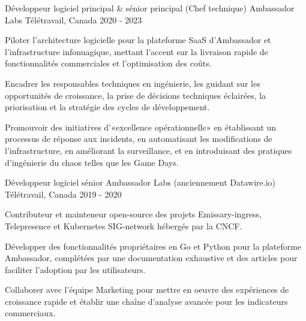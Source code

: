 \begin{cventries}
  \cventry
    {Développeur logiciel principal \& sénior principal (Chef technique)} %
    {Ambassador Labs} %
    {Télétravail, Canada} %
    {2020 - 2023} %
    {
      \begin{cvitems} %
        \item {Piloter l'architecture logicielle pour la plateforme SaaS d'Ambassador et l'infrastructure infonuagique, mettant l'accent sur la livraison rapide de fonctionnalités commerciales et l'optimisation des coûts.}
        \item {Encadrer les responsables techniques en ingénierie, les guidant sur les opportunités de croissance, la prise de décisions techniques éclairées, la priorisation et la stratégie des cycles de développement.}
        \item {Promouvoir des initiatives d'«excellence opérationnelle» en établissant un processus de réponse aux incidents, en automatisant les modifications de l'infrastructure, en améliorant la surveillance, et en introduisant des pratiques d'ingénierie du chaos telles que les Game Days.}
      \end{cvitems}
    }

  \cventry
    {Développeur logiciel sénior} %
    {Ambassador Labs (anciennement Datawire.io)} %
    {Télétravail, Canada} %
    {2019 - 2020} %
    {
      \begin{cvitems} %
        \item {Contributeur et mainteneur open-source des projets Emissary-ingress, Telepresence et Kubernetes SIG-network hébergés par la CNCF.}
        \item {Développer des fonctionnalités propriétaires en Go et Python pour la plateforme Ambassador, complétées par une documentation exhaustive et des articles pour faciliter l'adoption par les utilisateurs.}
        \item {Collaborer avec l'équipe Marketing pour mettre en oeuvre des expériences de croissance rapide et établir une chaîne d'analyse avancée pour les indicateurs commerciaux.}
      \end{cvitems}
    }


\end{cventries}
